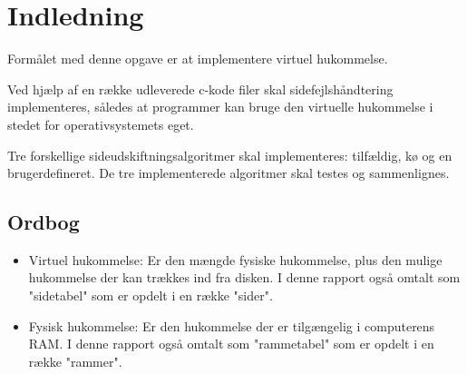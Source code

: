 \section{Indledning}
Formålet med denne opgave er at implementere virtuel hukommelse. 

Ved hjælp af en række udleverede c-kode filer skal sidefejlshåndtering implementeres, således at programmer kan bruge den virtuelle hukommelse i stedet for operativsystemets eget. 

Tre forskellige sideudskiftningsalgoritmer skal implementeres: tilfældig, kø og en brugerdefineret. De tre implementerede algoritmer skal testes og sammenlignes.

\subsection{Ordbog}
\begin{itemize}
	\item Virtuel hukommelse: Er den mængde fysiske hukommelse, plus den mulige hukommelse der kan trækkes ind fra disken. I denne rapport også omtalt som "sidetabel" som er opdelt i en række "sider".
	\item Fysisk hukommelse: Er den hukommelse der er tilgængelig i computerens RAM. I denne rapport også omtalt som "rammetabel" som er opdelt i en række "rammer".
\end{itemize}
